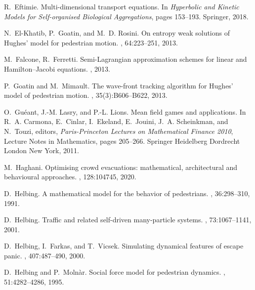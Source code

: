 \documentclass{cmslatex}
\begin{document}
\begin{thebibliography}{}
R.~Eftimie.
\newblock Multi-dimensional transport equations.
\newblock In {\em Hyperbolic and Kinetic Models for Self-organised Biological
  Aggregations}, pages 153--193. Springer, 2018.

N.~El-Khatib, P.~Goatin, and M.~D. Rosini.
\newblock On entropy weak solutions of {Hughes'} model for pedestrian motion.
, 64:223--251, 2013.

M.~Falcone, R.~Ferretti.
\newblock Semi-Lagrangian approximation schemes for linear and Hamilton--Jacobi equations.
, 2013.


P.~Goatin and M.~Mimault.
\newblock The wave-front tracking algorithm for {H}ughes' model of pedestrian
  motion.
, 35(3):B606--B622, 2013.

O.~Gu\'eant, J.-M. Lasry, and P.-L. Lions.
\newblock Mean field games and applications.
\newblock In R.~A. Carmona, E.~Cinlar, I.~Ekeland, E.~Jouini, J.~A. Scheinkman,
  and N.~Touzi, editors, {\em Paris-Princeton Lectures on Mathematical Finance
  2010}, Lecture Notes in Mathematics, pages 205--266. Springer Heidelberg
  Dordrecht London New York, 2011.
  

M.~Haghani.
\newblock Optimising crowd evacuations: mathematical, architectural and
  behavioural approaches.
, 128:104745, 2020.

D.~Helbing.
\newblock A mathematical model for the behavior of pedestrians.
, 36:298--310, 1991.

D.~Helbing.
\newblock Traffic and related self-driven many-particle systems.
, 73:1067--1141, 2001.

D.~Helbing, I.~Farkas, and T.~Vicsek.
\newblock Simulating dynamical features of escape panic.
, 407:487--490, 2000.

D.~Helbing and P.~Moln\`ar.
\newblock Social force model for pedestrian dynamics.
, 51:4282--4286, 1995.


\end{thebibliography}
\end{document}
